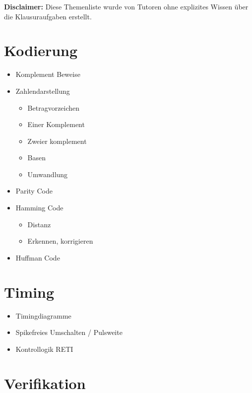 \documentclass{scrartcl}[9pt, a4paper]
\begin{document}
\textbf{Disclaimer:} Diese Themenliste wurde von Tutoren ohne explizites Wissen über die Klausuraufgaben erstellt.

\section*{Kodierung}

\begin{itemize}
	\item Komplement Beweise
	\item Zahlendarstellung
	      \begin{itemize}
	      	\item Betragvorzeichen
	      	\item Einer Komplement
	      	\item Zweier komplement
	      	\item Basen
	      	\item Umwandlung
	      \end{itemize}
	\item Parity Code
	\item Hamming Code
	      \begin{itemize}
	      	\item Distanz
	      	\item Erkennen, korrigieren
	      \end{itemize}
	\item Huffman Code
\end{itemize}

\section*{Timing}

\begin{itemize}
	\item Timingdiagramme
	\item Spikefreies Umschalten / Pulsweite
	\item Kontrollogik RETI
\end{itemize}

\section*{Verifikation}
\end{document}
